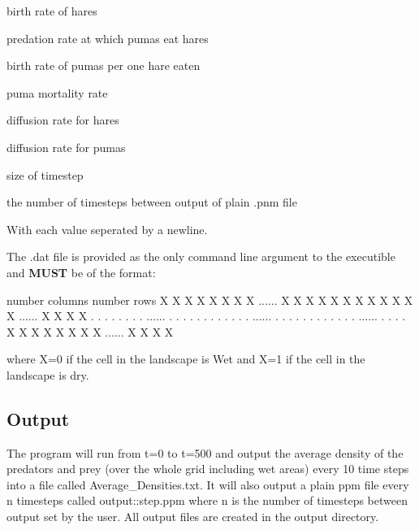 \begin{DoxyEnumerate}
\item birth rate of hares
\item predation rate at which pumas eat hares
\item birth rate of pumas per one hare eaten
\item puma mortality rate
\item diffusion rate for hares
\item diffusion rate for pumas
\item size of timestep
\item the number of timesteps between output of plain .pnm file
\end{DoxyEnumerate}

With each value seperated by a newline.

The .dat file is provided as the only command line argument to the executible and {\bfseries M\+U\+ST} be of the format\+:

number columns number rows X X X X X X X X ...... X X X X X X X X X X X X ...... X X X X . . . . . . . . ...... . . . . . . . . . . . . ...... . . . . . . . . . . . . ...... . . . . X X X X X X X X ...... X X X X

where X=0 if the cell in the landscape is Wet and X=1 if the cell in the landscape is dry.

\subsection*{Output}

The program will run from t=0 to t=500 and output the average density of the predators and prey (over the whole grid including wet areas) every 10 time steps into a file called Average\+\_\+\+Densities.\+txt. It will also output a plain ppm file every n timesteps called output\+::step.\+ppm where n is the number of timesteps between output set by the user. All output files are created in the output directory. 